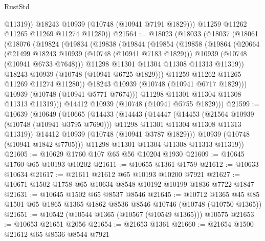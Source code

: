 \begin{lexlean}{RustStd}
\begin{coremodule}
              @11319))
          @18243
          @10939
          (@10748 (@10941 @7191 @1829)))
        @11259
        @11262
        @11265
        @11269
        @11274
        @11280))
@21564 := @18023
    (@18033
      (@18037
        (@18061
          (@18076
            (@19824
              (@19834
                (@19838
                  (@19844
                    (@19854
                      (@19858
                        (@19864
                          (@20664
                            (@21499 @18243 @10939 (@10748 (@10941 @7183 @1829)))
                            @10939
                            (@10748 (@10941 @6733 @7648)))
                          @11298
                          @11301
                          @11304
                          @11308
                          @11313
                          @11319))
                      @18243
                      @10939
                      (@10748 (@10941 @6725 @1829)))
                    @11259
                    @11262
                    @11265
                    @11269
                    @11274
                    @11280))
                @18243
                @10939
                (@10748 (@10941 @6717 @1829)))
              @10939
              (@10748 (@10941 @5771 @7674)))
            @11298
            @11301
            @11304
            @11308
            @11313
            @11319)))
      @14412
      @10939
      (@10748 (@10941 @5755 @1829)))
@21599 := @10639
    (@10649
      (@10665
        (@14433
          (@14443
            (@14447
              (@14453
                (@21564 @10939 (@10748 (@10941 @3795 @7690)))
                @11298
                @11301
                @11304
                @11308
                @11313
                @11319))
            @14412
            @10939
            (@10748 (@10941 @3787 @1829)))
          @10939
          (@10748 (@10941 @1842 @7705)))
        @11298
        @11301
        @11304
        @11308
        @11313
        @11319))
@21605 := @10629 @1760 @107 @65 @56 @10204 @1930
@21609 := @10645 @1760 @65 @10193 @10202
@21611 := @10655 @1361 @1759
@21612 := @10633 @10634
@21617 := @21611 @21612 @65 @10193 @10200 @7921
@21627 := @10671 @1502 @1758 @65 @10634 @8548 @10192 @10199 @1836 @7722 @1847
@21631 := @10645 @1502 @65 @8537 @8546
@21645 := @10712
    @1365
    @45
    @85
    @1501
    @65
    @1865
    @1365
    @1862
    @8536
    @8546
    @10746
    (@10748 (@10750 @1365))
@21651 := @10542 (@10544 @1365 (@10567 (@10549 @1365))) @10575
@21653 := @10653 @21651 @2056
@21654 := @21653 @1361
@21660 := @21654 @1500 @21612 @65 @8536 @8544 @7921

\end{coremodule}
\end{lexlean}
